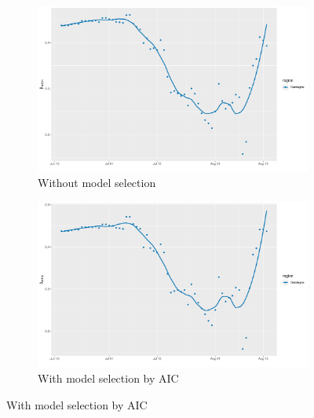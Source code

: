 \documentclass[12pt]{article}
\begin{document}
\begin{appendices}
		\begin{figure}[H]
    	    \centering
    	    \begin{subfigure}{\textwidth}
    	      \centering
    	      \includegraphics[width=0.92\linewidth]{output/model_within_lag14_betawithin_Isole_rolling.pdf}
    	      \caption{Without model selection}
    	      \label{fig:beta_within_over_time_isole_regular}
    	    \end{subfigure}\newline
    	    \begin{subfigure}{\textwidth}
    	      \centering
    	      \includegraphics[width=0.92\linewidth]{output/model_within_lag14_betawithin_Isole_aic_rolling.pdf}
    	      \caption{With model selection by AIC}
    	      \label{fig:beta_within_over_time_isole_aic}
    	    \end{subfigure}
    	\end{figure}
        \begin{figure}[H]\ContinuedFloat
    	    \begin{subfigure}{\textwidth}
    	      \centering

\end{subfigure}
\end{figure}
\end{appendices}
\end{document}
